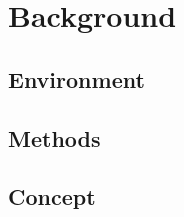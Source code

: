 
\chapter{Background} \label{chap:Background}
\minitoc\vspace{1em}
\Blindtext

\section{Environment} \label{sec:Environment}
\blindtext

\section{Methods} \label{sec:Methods}
\blindtext

\section{Concept} \label{sec:Concept}
\blindtext 

% 
% 
% 